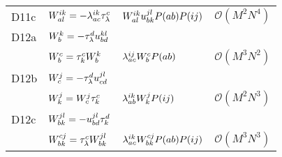 \begin{center}
\begin{longtable}{@{}llll@{}}
                D11c
                & $W^{ik}_{al} = - \lambda^{ik}_{ac} \tau^{c}_{\lambda}$
                & $W^{ik}_{al} u^{jl}_{bk} P(ab) P(ij)$
                & $\mathcal{O}(M^2 N^4)$
                \\

                D12a
                & $W^{k}_{b} = -\tau^{d}_{\lambda} u^{kl}_{bd}$
                \\
                & $W^{c}_{b} = \tau^{c}_{k} W^{k}_{b}$
                & $\lambda^{ij}_{ac} W^{c}_{b} P(ab)$
                & $\mathcal{O}(M^3 N^2)$
                \\

                D12b
                & $W^{j}_{c} = - \tau^{d}_{\lambda} u^{jl}_{cd}$
                \\
                & $W^{j}_{k} = W^{j}_{c} \tau^{c}_{k}$
                & $\lambda^{ik}_{ab} W^{j}_{k} P(ij)$
                & $\mathcal{O}(M^2 N^3)$
                \\


                D12c
                & $W^{jl}_{bk} = -u^{jl}_{bd} \tau^{d}_{k}$
                \\
                & $W^{cj}_{bk} = \tau^{c}_{\lambda} W^{jl}_{bk}$
                & $\lambda^{ik}_{ac} W^{cj}_{bk} P(ab) P(ij)$
                & $\mathcal{O}(M^3 N^3)$
                \\
            \end{longtable}
        \end{center}

